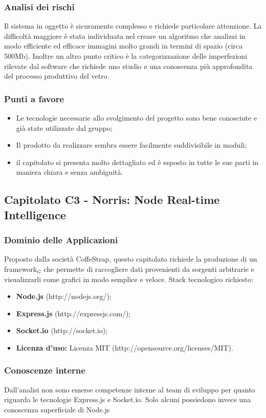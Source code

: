   \subsubsection{Analisi dei rischi}
  Il sistema in oggetto è sicuramente complesso e richiede particolare attenzione. La difficoltà maggiore è stata individuata nel creare un algoritmo che analizzi in modo efficiente ed efficace immagini molto grandi in termini di spazio (circa 500Mb). Inoltre un altro punto critico è la categorizzazione delle imperfezioni rilevate dal software che richiede uno studio e una conoscenza più approfondita del processo produttivo del vetro.
  \subsubsection{Punti a favore}
  \begin{itemize}
  	\item Le tecnologie necessarie allo svolgimento del progetto sono bene conosciute e già state utilizzate dal gruppo;
  	\item Il prodotto da realizzare sembra essere facilmente suddivisibile in moduli;
  	\item il capitolato si presenta molto dettagliato ed è esposto in tutte le sue parti in maniera chiara e senza ambiguità.
  \end{itemize}
\newpage
\subsection{Capitolato C3 - Norris: Node Real-time Intelligence}
  \subsubsection{Dominio delle Applicazioni}
  Proposto dalla società CoffeStrap, questo capitolato richiede la produzione di un framework$_G$ che permette di raccogliere dati provenienti da sorgenti arbitrarie e visualizzarli come grafici in modo semplice e veloce. Stack tecnologico richiesto:
  \begin{itemize}
  	\item \textbf{Node.js} (http://nodejs.org/);
  	\item \textbf{Express.js} (http://expressjs.com/);
  	\item \textbf{Socket.io} (http://socket.io);
  	\item \textbf{Licenza d'uso:} Licenza MIT (http://opensource.org/licenses/MIT).
  \end{itemize}
  \subsubsection{Conoscenze interne}
  Dall'analisi non sono emerse competenze interne al team di sviluppo per quanto riguarda le tecnologie Express.js e Socket.io. Solo alcuni possiedono invece una conoscenza superficiale di Node.js
